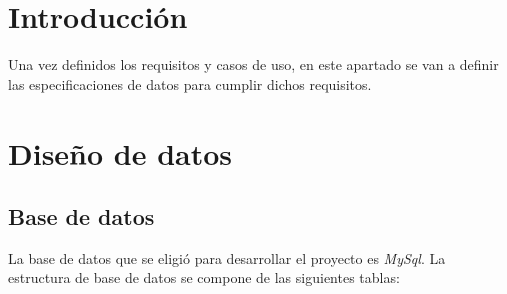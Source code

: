 
\section{Introducción}
Una vez definidos los requisitos y casos de uso, en este apartado se van a definir las especificaciones de datos para cumplir dichos requisitos.



\section{Diseño de datos}
\subsection{Base de datos}
La base de datos que se eligió para desarrollar el proyecto es \textit{MySql}. La estructura de base de datos se compone de las siguientes tablas:
